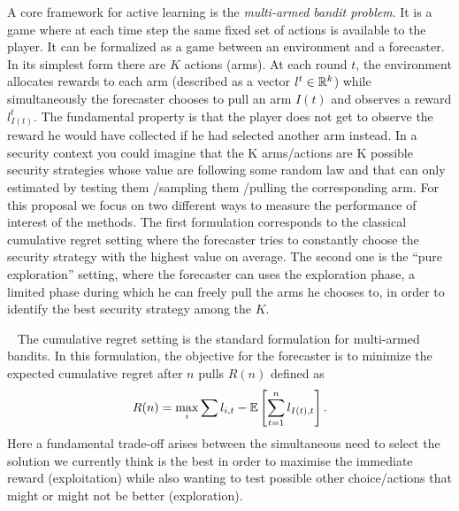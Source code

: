 A core framework for active learning is the \textit{multi-armed bandit problem}. It is a game where at each time step the same fixed set of actions is available to the player. It can be formalized as a game between an environment and a forecaster. In its simplest form there are $K$ actions (arms). At each round $t$, the environment allocates rewards to each arm (described as a vector $l^t\in\mathbb{R}^k$) while simultaneously the forecaster chooses to pull an arm $I(t)$ and observes a reward $l^t_{I(t)}$.  The fundamental property is that the player does not get to observe the reward he would have collected if he had selected another arm instead. In a security context you could imagine that the K arms/actions are K possible security strategies whose value are following some random law and that can  only estimated by testing  them /sampling them /pulling the corresponding arm. For this proposal we focus on two different ways to measure the performance of interest of the methods.  The first formulation corresponds to the classical cumulative regret setting where the forecaster tries to constantly choose the security strategy with the highest value on average.  The second one is the ``pure exploration'' setting, where the forecaster can uses the exploration phase, a limited phase during which he can freely pull the arms he chooses to, in order to identify the best  security strategy among the $K$.



\textbullet~ The cumulative regret setting is the standard formulation for multi-armed bandits. In this formulation, the objective for the forecaster is to minimize the expected cumulative regret after $n$ pulls $R(n)$ defined as
%
\begin{equation*}
R(n)=\max_i\sum l_{i,t}-{\mathbb{E}}\left[\sum_{t=1}^n l_{I(t),t}\right].
\end{equation*}
%
Here a fundamental trade-off arises between the simultaneous need to select the solution we currently think is the best in order to maximise the immediate reward  (exploitation)  while also wanting to test possible other choice/actions that might or might not be better (exploration).

